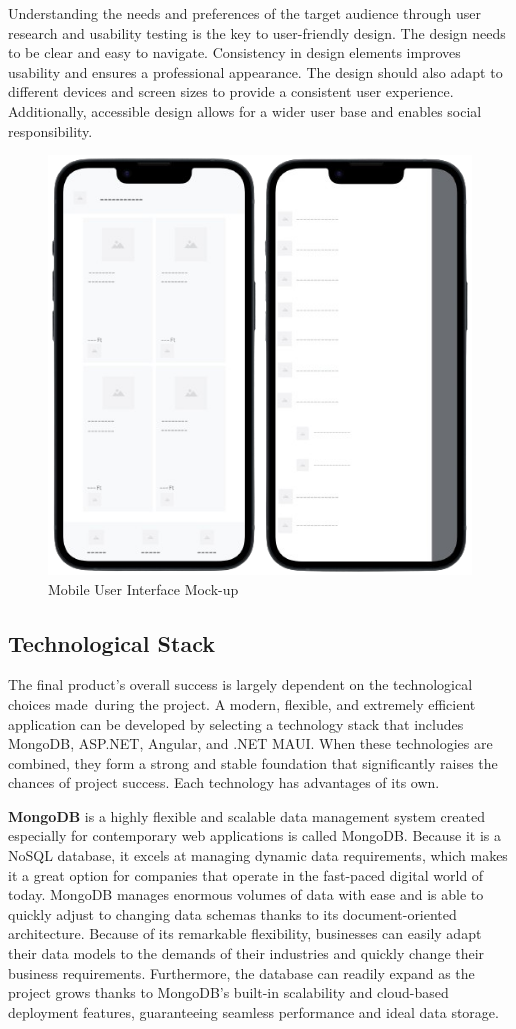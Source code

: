 Understanding the needs and preferences of the target audience through user research and usability testing is the key to user-friendly design. The design needs to be clear and easy to navigate. Consistency in design elements improves usability and ensures a professional appearance. The design should also adapt to different devices and screen sizes to provide a consistent user experience. Additionally,  accessible design allows for a wider user base and enables social responsibility. \cite{userFriendly}

\begin{figure}[H]
	\centering
	\includegraphics[width=0.3\linewidth]{img/ui_mockup.png}
	\caption{Mobile User Interface Mock-up}
	\label{fig:ur5}
\end{figure}

\subsection{Technological Stack}

The final product's overall success is largely dependent on the technological choices made during the project. A modern, flexible, and extremely efficient application can be developed by selecting a technology stack that includes MongoDB, ASP.NET, Angular, and .NET MAUI. When these technologies are combined, they form a strong and stable foundation that significantly raises the chances of project success. Each technology has advantages of its own.

\textbf{MongoDB} is a highly flexible and scalable data management system created especially for contemporary web applications is called {MongoDB}. Because it is a NoSQL database, it excels at managing dynamic data requirements, which makes it a great option for companies that operate in the fast-paced digital world of today. MongoDB manages enormous volumes of data with ease and is able to quickly adjust to changing data schemas thanks to its document-oriented architecture. Because of its remarkable flexibility, businesses can easily adapt their data models to the demands of their industries and quickly change their business requirements. Furthermore, the database can readily expand as the project grows thanks to MongoDB's built-in scalability and cloud-based deployment features, guaranteeing seamless performance and ideal data storage. \cite{mongodb}

